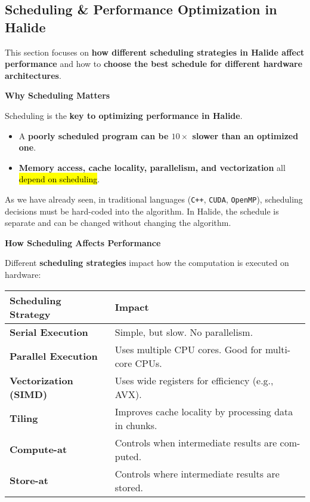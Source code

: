 \subsection{Scheduling \& Performance Optimization in Halide}

This section focuses on \textbf{how different scheduling strategies in Halide affect performance} and how to \textbf{choose the best schedule for different hardware architectures}.

\highspace
\begin{flushleft}
    \textcolor{Green3}{ \textbf{Why Scheduling Matters}}
\end{flushleft}
Scheduling is the \textbf{key to optimizing performance in Halide}.
\begin{itemize}
    \item A \textbf{poorly scheduled program can be $10\times$ slower than an optimized one}.
    \item \textbf{Memory access, cache locality, parallelism, and vectorization} all \hl{depend on scheduling}.
\end{itemize}
As we have already seen, in traditional languages (\texttt{C++}, \texttt{CUDA}, \texttt{OpenMP}), scheduling decisions must be hard-coded into the algorithm. In Halide, the schedule is separate and can be changed without changing the algorithm.

\highspace
\begin{flushleft}
    \textcolor{Green3}{ \textbf{How Scheduling Affects Performance}}
\end{flushleft}
Different \textbf{scheduling strategies} impact how the computation is executed on hardware:
\begin{table}[!htp]
    \centering
    \begin{tabular}{@{} l p{20em} @{}}
        \toprule
        \textbf{Scheduling Strategy} & \textbf{Impact} \\
        \midrule
        \textbf{Serial Execution} & Simple, but slow. No parallelism. \\ [.5em]
        \textbf{Parallel Execution} & Uses multiple CPU cores. Good for multi-core CPUs. \\ [.5em]
        \textbf{Vectorization (SIMD)} & Uses wide registers for efficiency (e.g., AVX). \\ [.5em]
        \textbf{Tiling} & Improves cache locality by processing data in chunks. \\ [.5em]
        \textbf{Compute-at} & Controls when intermediate results are com-\break puted. \\ [.5em]
        \textbf{Store-at} & Controls where intermediate results are stored. \\
        \bottomrule
    \end{tabular}
\end{table}

